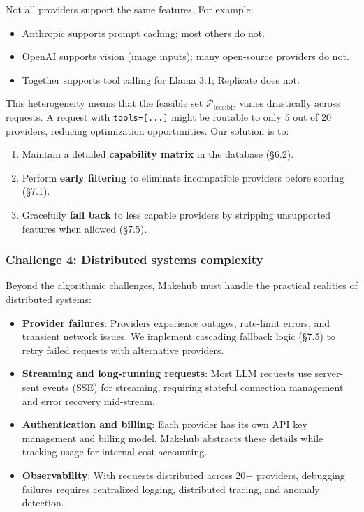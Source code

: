 \documentclass[english]{article}
\begin{document}
Not all providers support the same features. For example:
\begin{itemize}
    \item Anthropic supports prompt caching; most others do not.
    \item OpenAI supports vision (image inputs); many open-source providers do not.
    \item Together supports tool calling for Llama 3.1; Replicate does not.
\end{itemize}

This heterogeneity means that the feasible set $\mathcal{P}_{\text{feasible}}$ varies drastically across requests. A request with \texttt{tools=[...]} might be routable to only 5 out of 20 providers, reducing optimization opportunities. Our solution is to:
\begin{enumerate}
    \item Maintain a detailed \textbf{capability matrix} in the database (§6.2).
    \item Perform \textbf{early filtering} to eliminate incompatible providers before scoring (§7.1).
    \item Gracefully \textbf{fall back} to less capable providers by stripping unsupported features when allowed (§7.5).
\end{enumerate}

\subsubsection{Challenge 4: Distributed systems complexity}

Beyond the algorithmic challenges, Makehub must handle the practical realities of distributed systems:
\begin{itemize}
    \item \textbf{Provider failures}: Providers experience outages, rate-limit errors, and transient network issues. We implement cascading fallback logic (§7.5) to retry failed requests with alternative providers.
    \item \textbf{Streaming and long-running requests}: Most LLM requests use server-sent events (SSE) for streaming, requiring stateful connection management and error recovery mid-stream.
    \item \textbf{Authentication and billing}: Each provider has its own API key management and billing model. Makehub abstracts these details while tracking usage for internal cost accounting.
    \item \textbf{Observability}: With requests distributed across 20+ providers, debugging failures requires centralized logging, distributed tracing, and anomaly detection.
\end{itemize}
\end{document}
